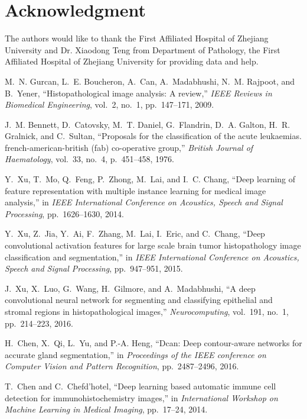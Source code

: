 \documentclass[journal]{IEEEtran}
\begin{document}
\section{Acknowledgment} 
The authors would like to thank the First Affiliated Hospital of Zhejiang University and Dr. Xiaodong Teng from Department of Pathology, the First Affiliated Hospital of Zhejiang University for providing data and help.
\medskip

\begin{thebibliography}{10}

M.~N. Gurcan, L.~E. Boucheron, A.~Can, A.~Madabhushi, N.~M. Rajpoot, and
  B.~Yener, ``Histopathological image analysis: A review,'' {\em IEEE Reviews
  in Biomedical Engineering}, vol.~2, no.~1, pp.~147--171, 2009.

J.~M. Bennett, D.~Catovsky, M.~T. Daniel, G.~Flandrin, D.~A. Galton, H.~R.
  Gralnick, and C.~Sultan, ``Proposals for the classification of the acute
  leukaemias. french-american-british (fab) co-operative group,'' {\em British
  Journal of Haematology}, vol.~33, no.~4, p.~451–458, 1976.

Y.~Xu, T.~Mo, Q.~Feng, P.~Zhong, M.~Lai, and I.~C. Chang, ``Deep learning of
  feature representation with multiple instance learning for medical image
  analysis,'' in {\em IEEE International Conference on Acoustics, Speech and
  Signal Processing}, pp.~1626--1630, 2014.

Y.~Xu, Z.~Jia, Y.~Ai, F.~Zhang, M.~Lai, I.~Eric, and C.~Chang, ``Deep
  convolutional activation features for large scale brain tumor histopathology
  image classification and segmentation,'' in {\em IEEE International
  Conference on Acoustics, Speech and Signal Processing}, pp.~947--951, 2015.

J.~Xu, X.~Luo, G.~Wang, H.~Gilmore, and A.~Madabhushi, ``A deep convolutional
  neural network for segmenting and classifying epithelial and stromal regions
  in histopathological images,'' {\em Neurocomputing}, vol.~191, no.~1,
  pp.~214--223, 2016.

H.~Chen, X.~Qi, L.~Yu, and P.-A. Heng, ``Dcan: Deep contour-aware networks for
  accurate gland segmentation,'' in {\em Proceedings of the IEEE conference on
  Computer Vision and Pattern Recognition}, pp.~2487--2496, 2016.

T.~Chen and C.~Chefd’hotel, ``Deep learning based automatic immune cell
  detection for immunohistochemistry images,'' in {\em International Workshop
  on Machine Learning in Medical Imaging}, pp.~17--24, 2014.


\end{thebibliography}
\end{document}
